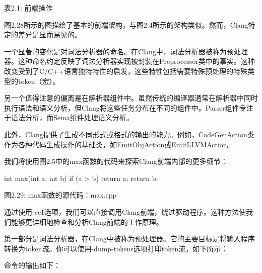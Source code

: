 \begin{center}
表2.1: 前端操作
\end{center}


图2.28所示的图描绘了基本的前端架构，与图2.4所示的架构类似。然而，Clang特定的差异是显而易见的。

一个显著的变化是对词法分析器的命名。在Clang中，词法分析器被称为预处理器。这种命名约定反映了词法分析器实现被封装在Preprocessor类中的事实。这种改变受到了C/C++语言独特特性的启发，这些特性包括需要特殊预处理的特殊类型的token（宏）。

另一个值得注意的偏离是在解析器组件中。虽然传统的编译器通常在解析器中同时执行语法和语义分析，但Clang将这些任务分布在不同的组件中。Parser组件专注于语法分析，而Sema组件处理语义分析。

此外，Clang提供了生成不同形式或格式的输出的能力。例如，CodeGenAction类作为各种代码生成操作的基础类，如EmitObjAction或EmitLLVMAction。

我们将使用图2.5中的max函数的代码来探索Clang前端内部的更多细节：

\begin{cpp}
int max(int a, int b) {
  if (a > b)
    return a;
  return b;
}
\end{cpp}

\begin{center}
图2.29: max函数的源代码：max.cpp
\end{center}

通过使用-cc1选项，我们可以直接调用Clang前端，绕过驱动程序。这种方法使我们能够更详细地检查和分析Clang前端的工作原理。


第一部分是词法分析器，在Clang中被称为预处理器。它的主要目标是将输入程序转换为token流。你可以使用-dump-tokens选项打印token流，如下所示：


命令的输出如下：

